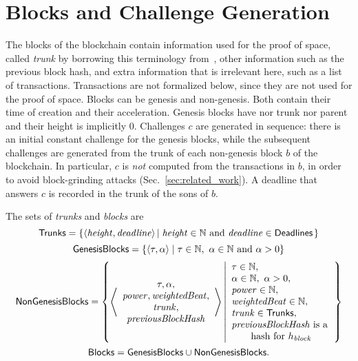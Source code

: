 \section{Blocks and Challenge Generation}\label{sec:challenge_generation}
%
The blocks of the blockchain contain information used for the proof
of space, called \emph{trunk} by borrowing this terminology from~\cite{CohenP19},
other information such as the previous block hash,
and extra information that is irrelevant here, such as a list of transactions.
Transactions are not formalized below, since they are not used for the proof of space.
Blocks can be genesis and non-genesis. Both contain their time of creation and their acceleration.
Genesis blocks have nor trunk nor parent and their height is implicitly $0$.
Challenges $c$ are generated in sequence: there is an initial constant challenge for the genesis
blocks, while the subsequent challenges are generated from the trunk of
each non-genesis block $b$ of the blockchain.
In particular, $c$ is \emph{not} computed from the transactions in $b$,
in order to avoid block-grinding attacks (Sec.~\ref{sec:related_work}).
A deadline that answers $c$ is recorded in the trunk of the sons of $b$.
%
\begin{definition}\label{def:trunk}
  The sets of \emph{trunks} and \emph{blocks} are
  \[
  {\mathsf{Trunks}}=\left\{\langle{\mathit{height}},{\mathit{deadline}}\rangle\left|\;{\mathit{height}}\in\mathbb{N}\text{ and }{\mathit{deadline}}\in{\mathsf{Deadlines}}\right.\right\}
  \]
  \[
  \GenesisBlocks=\left\{\langle\tau,\alpha\rangle\mid\tau\in\mathbb{N},\ \alpha\in\mathbb{N}\text{ and }\alpha>0\right\}
  \]
  \[
  {\mathsf{NonGenesisBlocks}}=\left\{\left\langle\begin{array}{c}
  \tau,\alpha,\\
  {\mathit{power}},\mathit{weightedBeat},\\
  {\mathit{trunk}},\\
  {\mathit{previousBlockHash}}
  \end{array}\right\rangle\left|\begin{array}{l}
  \tau\in\mathbb{N},\\
  \alpha\in\mathbb{N},\ \alpha>0,\\
  {\mathit{power}}\in\mathbb{N},\\
  \mathit{weightedBeat}\in\mathbb{N},\\
  {\mathit{trunk}}\in{\mathsf{Trunks}},\\
  {\mathit{previousBlockHash}}\text{ is a}\\
  \qquad\text{hash for $h_{\mathit{block}}$}
  \end{array}\right.\right\}
  \]
  \[
  {\mathsf{Blocks}}={\mathsf{GenesisBlocks}}\cup{\mathsf{NonGenesisBlocks}}.
  \]
\end{definition}
